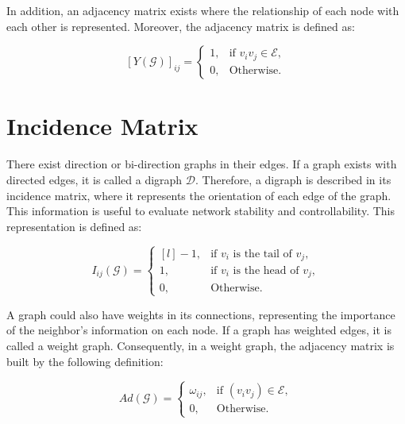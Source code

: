 In addition, an adjacency matrix exists where the relationship of each node with each other is represented. Moreover, the adjacency matrix is defined as:

\begin{equation}
    \left [ Y(\mathcal{G}) \right ]_{ij} = \left\{\begin{matrix}
1, & \text{if } v_{i}v_{j} \in \mathcal{E},\\ 
0, & \text{Otherwise.} 
\end{matrix}\right.
\end{equation}





\section*{Incidence Matrix}
There exist direction or bi-direction graphs in their edges. If a graph exists with directed edges, it is called a digraph $\mathcal{D}$. Therefore, a digraph is described in its incidence matrix, where it represents the orientation of each edge of the graph. This information is useful to evaluate network stability and controllability. This representation is defined as:

\begin{equation}
    I_{ij}(\mathcal{G}) = \left\{\begin{matrix*}[l]
-1, & \text{if } v_{i} \text{ is the tail of } v_{j},\\ 
1, & \text{if } v_{i} \text{ is the head of } v_{j},\\ 
0, &  \text{Otherwise.   }
\end{matrix*}\right.
\end{equation}

A graph could also have weights in its connections, representing the importance of the neighbor's information on each node. If a graph has weighted edges, it is called a weight graph. Consequently, in a weight graph, the adjacency matrix is built by the following definition:


\begin{equation}
    Ad(\mathcal{G}) = \left\{\begin{matrix}
\omega_{ij},   & \text{if } (v_{i}v_{j}) \in \mathcal{E}, \\ 
0, &  \text{Otherwise.}
\end{matrix}\right.
\end{equation}

